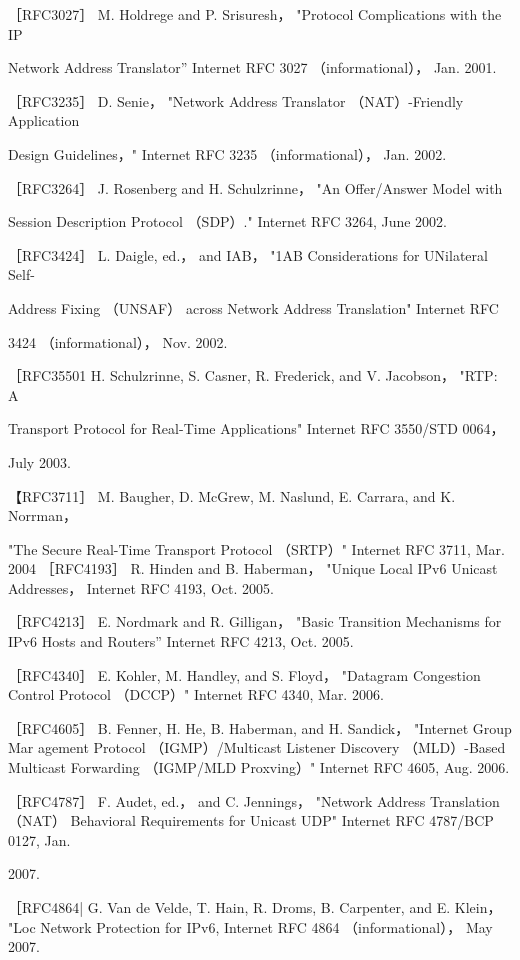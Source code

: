 ［RFC3027］ M. Holdrege and P. Srisuresh， "Protocol Complications with the IP

Network Address Translator” Internet RFC 3027 （informational）， Jan. 2001.

［RFC3235］ D. Senie， "Network Address Translator （NAT）-Friendly Application

Design Guidelines，" Internet RFC 3235 （informational）， Jan. 2002.

［RFC3264］ J. Rosenberg and H. Schulzrinne， "An Offer/Answer Model with

Session Description Protocol （SDP）." Internet RFC 3264, June 2002.

［RFC3424］ L. Daigle, ed.， and IAB， "1AB Considerations for UNilateral Self-

Address Fixing （UNSAF） across Network Address Translation" Internet RFC

3424 （informational）， Nov. 2002.

［RFC35501 H. Schulzrinne, S. Casner, R. Frederick, and V. Jacobson， "RTP: A

Transport Protocol for Real-Time Applications" Internet RFC 3550/STD 0064，

July 2003.

【RFC3711］ M. Baugher, D. McGrew, M. Naslund, E. Carrara, and K. Norrman，

"The Secure Real-Time Transport Protocol （SRTP）" Internet RFC 3711, Mar. 2004
［RFC4193］ R. Hinden and B. Haberman， "Unique Local IPv6 Unicast Addresses，
Internet RFC 4193, Oct. 2005.

［RFC4213］ E. Nordmark and R. Gilligan， "Basic Transition Mechanisms for IPv6
Hosts and Routers” Internet RFC 4213, Oct. 2005.

［RFC4340］ E. Kohler, M. Handley, and S. Floyd， "Datagram Congestion Control
Protocol （DCCP）" Internet RFC 4340, Mar. 2006.

［RFC4605］ B. Fenner, H. He, B. Haberman, and H. Sandick， "Internet Group Mar
agement Protocol （IGMP）/Multicast Listener Discovery （MLD）-Based Multicast
Forwarding （IGMP/MLD Proxving）" Internet RFC 4605, Aug. 2006.

［RFC4787］ F. Audet, ed.， and C. Jennings， "Network Address Translation （NAT）
Behavioral Requirements for Unicast UDP" Internet RFC 4787/BCP 0127, Jan.

2007.

［RFC4864| G. Van de Velde, T. Hain, R. Droms, B. Carpenter, and E. Klein， "Loc
Network Protection for IPv6, Internet RFC 4864 （informational）， May 2007.

